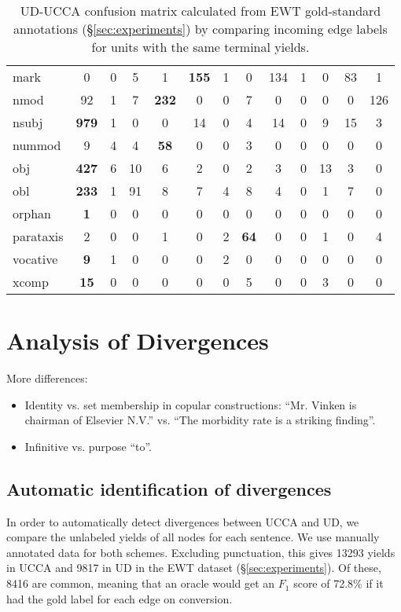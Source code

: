 \documentclass[11pt,a4paper]{article}
\begin{document}
\begin{table}[t]
\begin{tabular}{l|cccccccccccc}
mark & 0 & 0 & 5 & 1 & \textbf{155} & 1 & 0 & 134 & 1 & 0 & 83 & 1 \\
nmod & 92 & 1 & 7 & \textbf{232} & 0 & 0 & 7 & 0 & 0 & 0 & 0 & 126 \\
nsubj & \textbf{979} & 1 & 0 & 0 & 14 & 0 & 4 & 14 & 0 & 9 & 15 & 3 \\
nummod & 9 & 4 & 4 & \textbf{58} & 0 & 0 & 3 & 0 & 0 & 0 & 0 & 0 \\
obj & \textbf{427} & 6 & 10 & 6 & 2 & 0 & 2 & 3 & 0 & 13 & 3 & 0 \\
obl & \textbf{233} & 1 & 91 & 8 & 7 & 4 & 8 & 4 & 0 & 1 & 7 & 0 \\
orphan & \textbf{1} & 0 & 0 & 0 & 0 & 0 & 0 & 0 & 0 & 0 & 0 & 0 \\
parataxis & 2 & 0 & 0 & 1 & 0 & 2 & \textbf{64} & 0 & 0 & 1 & 0 & 4 \\
vocative & \textbf{9} & 1 & 0 & 0 & 0 & 2 & 0 & 0 & 0 & 0 & 0 & 0 \\
xcomp & \textbf{15} & 0 & 0 & 0 & 0 & 0 & 5 & 0 & 0 & 3 & 0 & 0
\end{tabular}
\caption{UD-UCCA confusion matrix calculated from EWT
gold-standard annotations (\S\ref{sec:experiments})
by comparing incoming edge labels for units with the same terminal yields.
\label{tab:confusion_matrix}}
\end{table}



\section{Analysis of Divergences}\label{sec:analysis}


More differences:
\begin{itemize}
\item Identity vs. set membership in copular constructions:
    ``Mr. Vinken is chairman of Elsevier N.V.'' vs. ``The morbidity rate is a striking finding''.
\item Infinitive vs. purpose ``to''. 
\end{itemize}

\subsection{Automatic identification of divergences}

In order to automatically detect divergences between UCCA and UD,
we compare the unlabeled yields of all nodes for each sentence.
We use manually annotated data for both schemes.
Excluding punctuation, this gives 13293 yields in UCCA and
9817 in UD in the EWT dataset (\S\ref{sec:experiments}).
Of these, 8416 are common, meaning that an oracle would get an $F_1$ score
of 72.8\% if it had the gold label for each edge on conversion.
\end{document}
